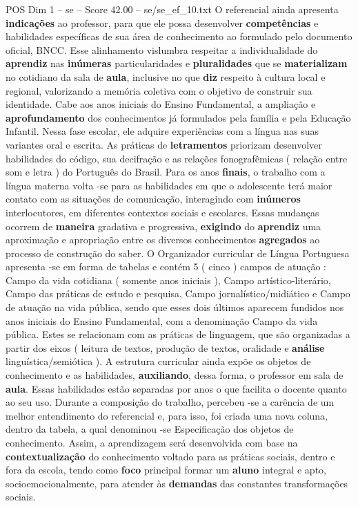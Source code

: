 \begin{textsample}{POS Dim 1 – se – Score 42.00 – se/se\_ef\_10.txt}
O referencial ainda apresenta \textbf{indicações} ao professor, para que ele possa desenvolver \textbf{competências} e habilidades específicas de sua área de conhecimento ao formulado pelo documento oficial, BNCC.
Esse alinhamento vislumbra respeitar a individualidade do \textbf{aprendiz} nas \textbf{inúmeras} particularidades e \textbf{pluralidades} que se \textbf{materializam} no cotidiano da sala de \textbf{aula}, inclusive no que \textbf{diz} respeito à cultura local e regional, valorizando a memória coletiva com o objetivo de construir sua identidade.
Cabe aos anos iniciais do Ensino Fundamental, a ampliação e \textbf{aprofundamento} dos conhecimentos já formulados pela família e pela Educação Infantil.
Nessa fase escolar, ele adquire experiências com a língua nas suas variantes oral e escrita.
As práticas de \textbf{letramentos} priorizam desenvolver habilidades do código, sua decifração e as relações fonografêmicas ( relação entre som e letra ) do Português do Brasil.
Para os anos \textbf{finais}, o trabalho com a língua materna volta -se para as habilidades em que o adolescente terá maior contato com as situações de comunicação, interagindo com \textbf{inúmeros} interlocutores, em diferentes contextos sociais e escolares.
Essas mudanças ocorrem de \textbf{maneira} gradativa e progressiva, \textbf{exigindo} do \textbf{aprendiz} uma aproximação e apropriação entre os diversos conhecimentos \textbf{agregados} ao processo de construção do saber.
O Organizador curricular de Língua Portuguesa apresenta -se em forma de tabelas e contém 5 ( cinco ) campos de atuação : Campo da vida cotidiana ( somente anos iniciais ), Campo artístico-literário, Campo das práticas de estudo e pesquisa, Campo jornalístico/midiático e Campo de atuação na vida pública, sendo que esses dois últimos aparecem fundidos nos anos iniciais do Ensino Fundamental, com a denominação Campo da vida pública.
Estes se relacionam com as práticas de linguagem, que são organizadas a partir dos eixos ( leitura de textos, produção de textos, oralidade e \textbf{análise} linguística/semiótica ).
A estrutura curricular ainda expõe os objetos de conhecimento e as habilidades, \textbf{auxiliando}, dessa forma, o professor em sala de \textbf{aula}.
Essas habilidades estão separadas por anos o que facilita o docente quanto ao seu uso.
Durante a composição do trabalho, percebeu -se a carência de um melhor entendimento do referencial e, para isso, foi criada uma nova coluna, dentro da tabela, a qual denominou -se Especificação dos objetos de conhecimento.
Assim, a aprendizagem será desenvolvida com base na \textbf{contextualização} do conhecimento voltado para as práticas sociais, dentro e fora da escola, tendo como \textbf{foco} principal formar um \textbf{aluno} integral e apto, socioemocionalmente, para atender às \textbf{demandas} das constantes transformações sociais.

\end{textsample}
